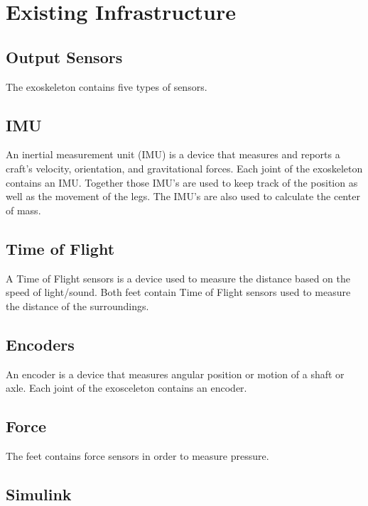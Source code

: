 \section{Existing Infrastructure}
\subsection{Output Sensors}
The exoskeleton contains five types of sensors.
\subsection{IMU}
An inertial measurement unit (IMU) is a device that measures and reports a craft's velocity, orientation, and gravitational forces. Each joint of the exoskeleton contains an IMU. Together those IMU's are used to keep track of the position as well as the movement of the legs. The IMU's are also used to calculate the center of mass. 
\subsection{Time of Flight}
A Time of Flight sensors is a device used to measure the distance based on the speed of light/sound. Both feet contain Time of Flight sensors used to measure the distance of the surroundings.
\subsection{Encoders}
An encoder is a device that measures angular position or motion of a shaft or axle. Each joint of the exosceleton contains an encoder. 
\subsection{Force}
The feet contains force sensors in order to measure pressure.

\subsection{Simulink}